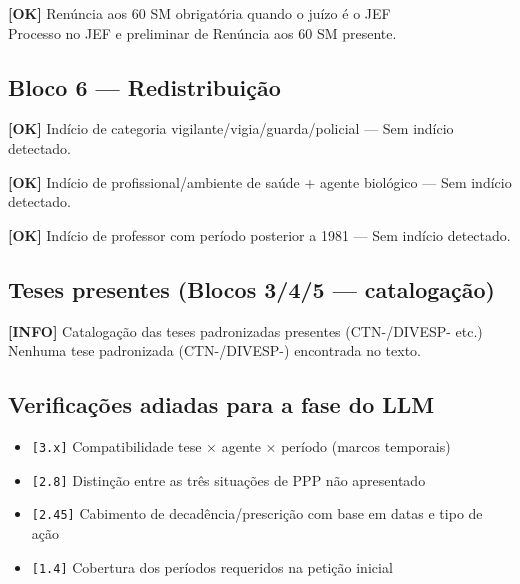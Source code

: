 \documentclass[12pt,a4paper]{article}
\newcommand{\statusOK}[1]{\textcolor{corOK}{\textbf{[OK]}} #1}
\newcommand{\statusINFO}[1]{\textcolor{corINFO}{\textbf{[INFO]}} #1}
\begin{document}
\statusOK{Renúncia aos 60 SM obrigatória quando o juízo é o JEF}\\
Processo no JEF e preliminar de Renúncia aos 60 SM presente.

\subsection{Bloco 6 --- Redistribuição}

\statusOK{Indício de categoria vigilante/vigia/guarda/policial} --- Sem indício detectado.

\medskip
\statusOK{Indício de profissional/ambiente de saúde + agente biológico} --- Sem indício detectado.

\medskip
\statusOK{Indício de professor com período posterior a 1981} --- Sem indício detectado.

\subsection{Teses presentes (Blocos 3/4/5 --- catalogação)}

\statusINFO{Catalogação das teses padronizadas presentes (CTN-/DIVESP- etc.)}\\
Nenhuma tese padronizada (CTN-/DIVESP-) encontrada no texto.

\subsection{Verificações adiadas para a fase do LLM}

\begin{itemize}
  \item \texttt{[3.x]} Compatibilidade tese × agente × período (marcos temporais)
  \item \texttt{[2.8]} Distinção entre as três situações de PPP não apresentado
  \item \texttt{[2.45]} Cabimento de decadência/prescrição com base em datas e tipo de ação
  \item \texttt{[1.4]} Cobertura dos períodos requeridos na petição inicial
\end{itemize}
\end{document}
